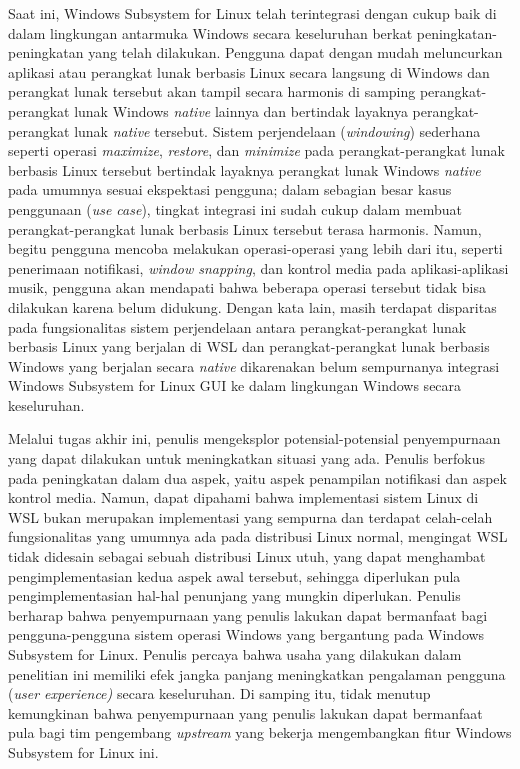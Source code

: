Saat ini, Windows Subsystem for Linux telah terintegrasi dengan cukup baik di dalam lingkungan antarmuka Windows secara keseluruhan berkat peningkatan-peningkatan yang telah dilakukan. Pengguna dapat dengan mudah meluncurkan aplikasi atau perangkat lunak berbasis Linux secara langsung di Windows dan perangkat lunak tersebut akan tampil secara harmonis di samping perangkat-perangkat lunak Windows \textit{native} lainnya dan bertindak layaknya perangkat-perangkat lunak \textit{native} tersebut. Sistem perjendelaan (\textit{windowing}) sederhana seperti operasi \textit{maximize}, \textit{restore}, dan \textit{minimize} pada perangkat-perangkat lunak berbasis Linux tersebut bertindak layaknya perangkat lunak Windows \textit{native} pada umumnya sesuai ekspektasi pengguna; dalam sebagian besar kasus penggunaan (\textit{use case}), tingkat integrasi ini sudah cukup dalam membuat perangkat-perangkat lunak berbasis Linux tersebut terasa harmonis. Namun, begitu pengguna mencoba melakukan operasi-operasi yang lebih dari itu, seperti penerimaan notifikasi, \textit{window snapping}, dan kontrol media pada aplikasi-aplikasi musik, pengguna akan mendapati bahwa beberapa operasi tersebut tidak bisa dilakukan karena belum didukung. Dengan kata lain, masih terdapat disparitas pada fungsionalitas sistem perjendelaan antara perangkat-perangkat lunak berbasis Linux yang berjalan di WSL dan perangkat-perangkat lunak berbasis Windows yang berjalan secara \textit{native} dikarenakan belum sempurnanya integrasi Windows Subsystem for Linux GUI ke dalam lingkungan Windows secara keseluruhan.

Melalui tugas akhir ini, penulis mengeksplor potensial-potensial penyempurnaan yang dapat dilakukan untuk meningkatkan situasi yang ada. Penulis berfokus pada peningkatan dalam dua aspek, yaitu aspek penampilan notifikasi dan aspek kontrol media. Namun, dapat dipahami bahwa implementasi sistem Linux di WSL bukan merupakan implementasi yang sempurna dan terdapat celah-celah fungsionalitas yang umumnya ada pada distribusi Linux normal, mengingat WSL tidak didesain sebagai sebuah distribusi Linux utuh, yang dapat menghambat pengimplementasian kedua aspek awal tersebut, sehingga diperlukan pula pengimplementasian hal-hal penunjang yang mungkin diperlukan. Penulis berharap bahwa penyempurnaan yang penulis lakukan dapat bermanfaat bagi pengguna-pengguna sistem operasi Windows yang bergantung pada Windows Subsystem for Linux. Penulis percaya bahwa usaha yang dilakukan dalam penelitian ini memiliki efek jangka panjang meningkatkan pengalaman pengguna (\textit{user experience)} secara keseluruhan. Di samping itu, tidak menutup kemungkinan bahwa penyempurnaan yang penulis lakukan dapat bermanfaat pula bagi tim pengembang \textit{upstream} yang bekerja mengembangkan fitur Windows Subsystem for Linux ini.



